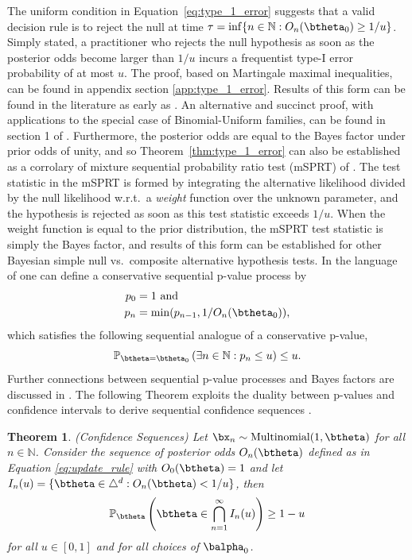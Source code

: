 \documentclass[11pt]{article}
\newtheorem{thm}{Theorem}[section]
\begin{document}
The uniform condition in Equation~\ref{eq:type_1_error} suggests that a valid decision rule is to reject the null at time $\tau = \inf \lbrace n \in \mathbb{N}: O_n(\btheta_0) \geq 1/u \rbrace$.
Simply stated, a practitioner who rejects the null hypothesis as soon as the posterior odds become larger than $1/u$ incurs a frequentist type-I error probability of at most $u$.
The proof, based on Martingale maximal inequalities, can be found in appendix section \ref{app:type_1_error}.
Results of this form can be found in the literature as early as \cite{ville}.
An alternative and succinct proof, with applications to the special case of Binomial-Uniform families, can be found in section 1 of \cite{robbins}.
Furthermore, the posterior odds are equal to the Bayes factor under prior odds of unity, and so Theorem~\ref{thm:type_1_error} can also be established as a corrolary of mixture sequential probability ratio test (mSPRT) of \cite{wald}.
The test statistic in the mSPRT is formed by integrating the alternative likelihood divided by the null likelihood w.r.t.\ a \textit{weight} function over the unknown parameter, and the hypothesis is rejected as soon as this test statistic exceeds $1/u$.
When the weight function is equal to the prior distribution, the mSPRT test statistic is simply the Bayes factor, and results of this form can be established for other Bayesian simple null vs.\ composite alternative hypothesis tests.
In the language of \cite{johari} one can define a conservative sequential p-value process by
\begin{align*}
  p_0 &=1 \text{ and}\\
  p_n &= \min(p_{n-1}, 1/O_n(\btheta_0)),
\end{align*}
which satisfies the following sequential analogue of a conservative p-value,
\begin{equation}
  \label{eq:conservative_p_value}
  \mathbb{P}_{\btheta = \btheta_0}\left( \exists n \in \mathbb{N}: p_n \leq u \right) \leq u.
\end{equation}
Further connections between sequential p-value processes and Bayes factors are discussed in \cite{shafer}.
The following Theorem exploits the duality between p-values and confidence intervals to derive sequential confidence sequences .
\begin{thm}(Confidence Sequences)
  \label{thm:confidence_sequence}
  \noindent Let $\bx_n\sim \mathrm{Multinomial}(1,\btheta)$ for all $n \in \mathbb{N}$.
Consider the sequence of posterior odds $O_n(\btheta)$ defined as in Equation \eqref{eq:update_rule} with $O_0(\btheta)=1$ and
 let $I_n(u) = \lbrace \btheta \in \triangle^d : O_n(\btheta) < 1/u  \rbrace$, then
\begin{equation}
  \label{eq:confidence_sequence}
  \mathbb{P}_{\btheta}\left( \btheta \in \bigcap_{n=1}^{\infty} I_n(u) \right) \geq 1- u
\end{equation}
for all $u \in [0,1]$ and for all choices of $\balpha_0$.
\end{thm}
\end{document}
